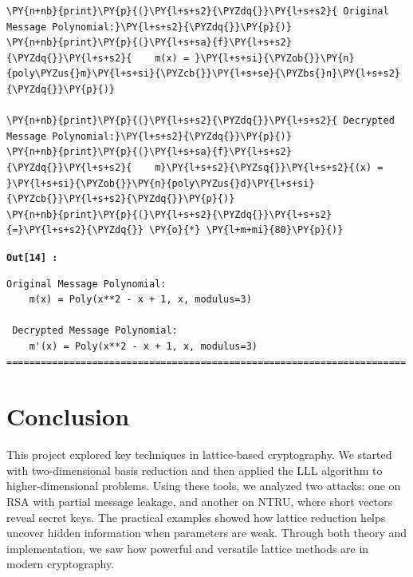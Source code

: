 \documentclass[a4paper,12pt]{article}
\begin{document}
\begin{tcolorbox}[breakable, size=fbox, boxrule=1pt, pad at break*=1mm,colback=cellbackground, colframe=cellborder]
\begin{Verbatim}[commandchars=\\\{\}]
\PY{n+nb}{print}\PY{p}{(}\PY{l+s+s2}{\PYZdq{}}\PY{l+s+s2}{ Original Message Polynomial:}\PY{l+s+s2}{\PYZdq{}}\PY{p}{)}
\PY{n+nb}{print}\PY{p}{(}\PY{l+s+sa}{f}\PY{l+s+s2}{\PYZdq{}}\PY{l+s+s2}{    m(x) = }\PY{l+s+si}{\PYZob{}}\PY{n}{poly\PYZus{}m}\PY{l+s+si}{\PYZcb{}}\PY{l+s+se}{\PYZbs{}n}\PY{l+s+s2}{\PYZdq{}}\PY{p}{)}

\PY{n+nb}{print}\PY{p}{(}\PY{l+s+s2}{\PYZdq{}}\PY{l+s+s2}{ Decrypted Message Polynomial:}\PY{l+s+s2}{\PYZdq{}}\PY{p}{)}
\PY{n+nb}{print}\PY{p}{(}\PY{l+s+sa}{f}\PY{l+s+s2}{\PYZdq{}}\PY{l+s+s2}{    m}\PY{l+s+s2}{\PYZsq{}}\PY{l+s+s2}{(x) = }\PY{l+s+si}{\PYZob{}}\PY{n}{poly\PYZus{}d}\PY{l+s+si}{\PYZcb{}}\PY{l+s+s2}{\PYZdq{}}\PY{p}{)}
\PY{n+nb}{print}\PY{p}{(}\PY{l+s+s2}{\PYZdq{}}\PY{l+s+s2}{=}\PY{l+s+s2}{\PYZdq{}} \PY{o}{*} \PY{l+m+mi}{80}\PY{p}{)}
\end{Verbatim}
\end{tcolorbox}

\begin{tcolorbox}[colback=white, colframe=gray!60, boxrule=0.5pt]
\texttt{\textbf{Out[14] :}}
    \begin{Verbatim}[commandchars=\\\{\}]
 Original Message Polynomial:
    m(x) = Poly(x**2 - x + 1, x, modulus=3)

 Decrypted Message Polynomial:
    m'(x) = Poly(x**2 - x + 1, x, modulus=3)
======================================================================
    \end{Verbatim}
\end{tcolorbox}





\newpage
\section{Conclusion}

This project explored key techniques in lattice-based cryptography. We started with two-dimensional basis reduction and then applied the LLL algorithm to higher-dimensional problems. Using these tools, we analyzed two attacks: one on RSA with partial message leakage, and another on NTRU, where short vectors reveal secret keys. The practical examples showed how lattice reduction helps uncover hidden information when parameters are weak. Through both theory and implementation, we saw how powerful and versatile lattice methods are in modern cryptography.
\end{document}
